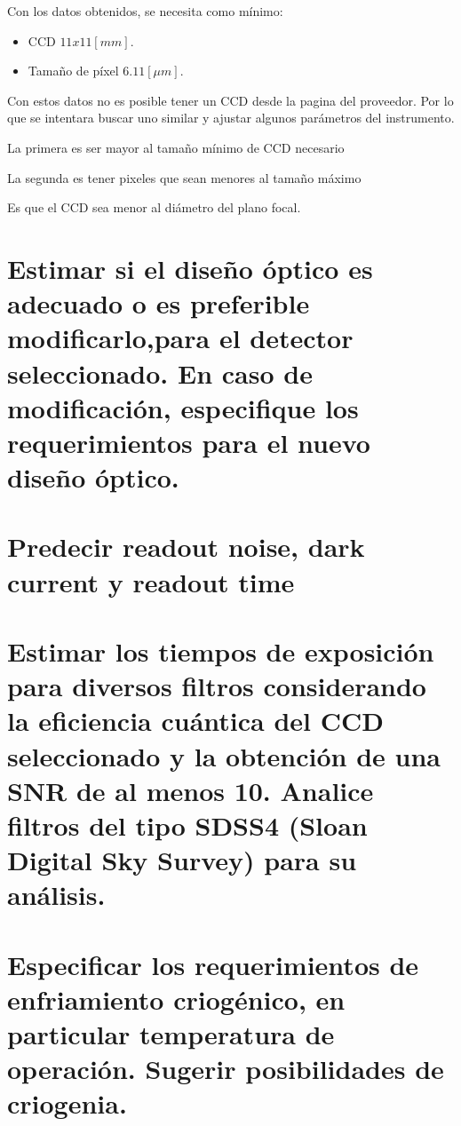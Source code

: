 \documentclass[a4paper,10pt]{article}
\begin{document}
Con los datos obtenidos, se necesita como mínimo:
\begin{itemize}
\item CCD $11x11[mm]$.
\item Tamaño de píxel $6.11 [\mu m]$.
\end{itemize}

Con estos datos no es posible tener un CCD desde la pagina del proveedor. Por lo que se intentara buscar uno similar y ajustar algunos parámetros del instrumento.

La primera es ser mayor al tamaño mínimo de CCD necesario

La segunda es tener pixeles que sean menores al tamaño máximo

Es que el CCD sea menor al diámetro del plano focal. 



\section{Estimar si el diseño óptico es adecuado o es preferible
modificarlo,para el detector seleccionado. En caso de modificación, especifique
los requerimientos para el nuevo diseño óptico.}

\section{Predecir readout noise, dark current y readout time}

\section{Estimar los tiempos de exposición para diversos filtros considerando la
eficiencia cuántica del CCD seleccionado y la obtención de una SNR de al menos
10. Analice filtros del tipo SDSS4 (Sloan Digital Sky Survey) para su análisis.}

\section{Especificar los requerimientos de enfriamiento criogénico, en particular
temperatura de operación. Sugerir posibilidades de criogenia.}
\end{document}
